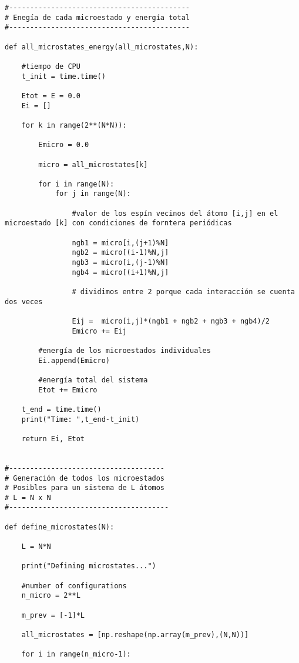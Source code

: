 \documentclass[a4paper,12pt]{article}
\begin{document}
 \begin{verbatim}
#-------------------------------------------
# Enegía de cada microestado y energía total 
#-------------------------------------------

def all_microstates_energy(all_microstates,N):

    #tiempo de CPU
    t_init = time.time()

    Etot = E = 0.0
    Ei = []

    for k in range(2**(N*N)):
        
        Emicro = 0.0
       
        micro = all_microstates[k]    
        
        for i in range(N):
            for j in range(N):
            
                #valor de los espín vecinos del átomo [i,j] en el microestado [k] con condiciones de forntera periódicas

                ngb1 = micro[i,(j+1)%N]
                ngb2 = micro[(i-1)%N,j]
                ngb3 = micro[i,(j-1)%N]
                ngb4 = micro[(i+1)%N,j]

                # dividimos entre 2 porque cada interacción se cuenta dos veces
                
                Eij =  micro[i,j]*(ngb1 + ngb2 + ngb3 + ngb4)/2 
                Emicro += Eij
                
        #energía de los microestados individuales
        Ei.append(Emicro)

        #energía total del sistema
        Etot += Emicro
        
    t_end = time.time()
    print("Time: ",t_end-t_init)

    return Ei, Etot


#-------------------------------------
# Generación de todos los microestados 
# Posibles para un sistema de L átomos
# L = N x N
#--------------------------------------

def define_microstates(N):

    L = N*N

    print("Defining microstates...")
    
    #number of configurations
    n_micro = 2**L

    m_prev = [-1]*L

    all_microstates = [np.reshape(np.array(m_prev),(N,N))]
    
    for i in range(n_micro-1):
    

\end{verbatim}
\end{document}
